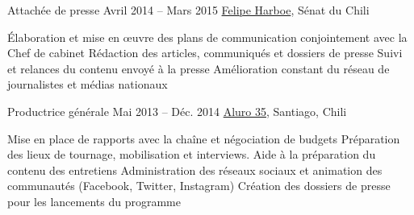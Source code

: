 %
%



\begin{joblist}




\item[Attachée de presse]{Avril 2014 -- Mars 2015}
     { \href{https://www.harboe.cl/}{Felipe Harboe}, Sénat du Chili } 
	 {
                
			\iftbftiny \setlength{\parskip}{-10pt} \fi
			\begin{itemize}
			  \iftbftiny \setlength\itemsep{-3pt} \fi
			  \cvitem[\checkmark] Élaboration et mise en œuvre des plans de communication conjointement avec la Chef de cabinet
			  \cvitem[\checkmark] Rédaction des articles, communiqués et dossiers de presse
			  \cvitem[\checkmark] Suivi et relances du contenu envoyé à la presse
			  \cvitem[\checkmark] Amélioration constant du réseau de journalistes et médias nationaux
			\end{itemize}     
			
	}
    
    
    
\item[Productrice générale]{Mai 2013 -- Déc. 2014}
     {\href{https://www.aluro35.com/}  {Aluro 35}, Santiago, Chili}
     {	
			
			\iftbftiny \setlength{\parskip}{-10pt} \fi
			\begin{itemize}
			  \iftbftiny \setlength\itemsep{-3pt} \fi
			  \cvitem[\checkmark] Mise en place de rapports avec la chaîne et négociation de budgets                       
			  \cvitem[\checkmark] Préparation des lieux de tournage, mobilisation et interviews. Aide à la préparation du contenu des entretiens 
			  \cvitem[\checkmark] Administration des réseaux sociaux et animation des communautés (Facebook, Twitter, Instagram)                 
			  \cvitem[\checkmark] Création des dossiers de presse pour les lancements du programme                                             
			\end{itemize}     
			
}
\end{joblist}
